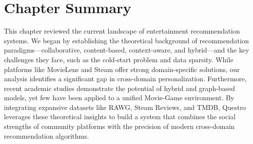 \section{Chapter Summary}
\label{sec:related_work_summary}
This chapter reviewed the current landscape of entertainment recommendation systems. We began by establishing the theoretical background of recommendation paradigms—collaborative, content-based, context-aware, and hybrid—and the key challenges they face, such as the cold-start problem and data sparsity. While platforms like MovieLens and Steam offer strong domain-specific solutions, our analysis identifies a significant gap in cross-domain personalization. Furthermore, recent academic studies demonstrate the potential of hybrid and graph-based models, yet few have been applied to a unified Movie-Game environment. By integrating expansive datasets like RAWG, Steam Reviews, and TMDB, Questro leverages these theoretical insights to build a system that combines the social strengths of community platforms with the precision of modern cross-domain recommendation algorithms.